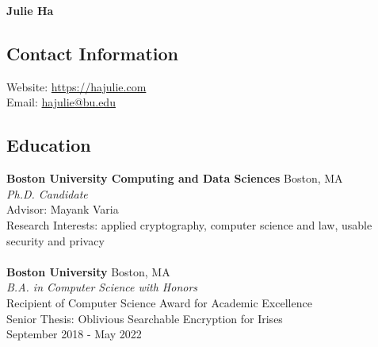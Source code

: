 \documentclass[letterpaper,11pt]{article}
\begin{document}
\begin{center}
    {\LARGE \bf Julie Ha}
\end{center}

\subsection*{{Contact Information}}
Website: \url{https://hajulie.com}
\\
Email: \href{mailto:hajulie@bu.edu}{hajulie@bu.edu}

\subsection*{{Education}}
\textbf{Boston University Computing and Data Sciences} Boston, MA\\
\textit{Ph.D. Candidate}\\
Advisor: Mayank Varia\\
Research Interests: applied cryptography, computer science and law, usable security and privacy\\
~\\
\textbf{Boston University} Boston, MA\\
\textit{B.A. in Computer Science with Honors}\\
Recipient of Computer Science Award for Academic Excellence\\
Senior Thesis: Oblivious Searchable Encryption for Irises\\
September 2018 - May 2022
\end{document}
